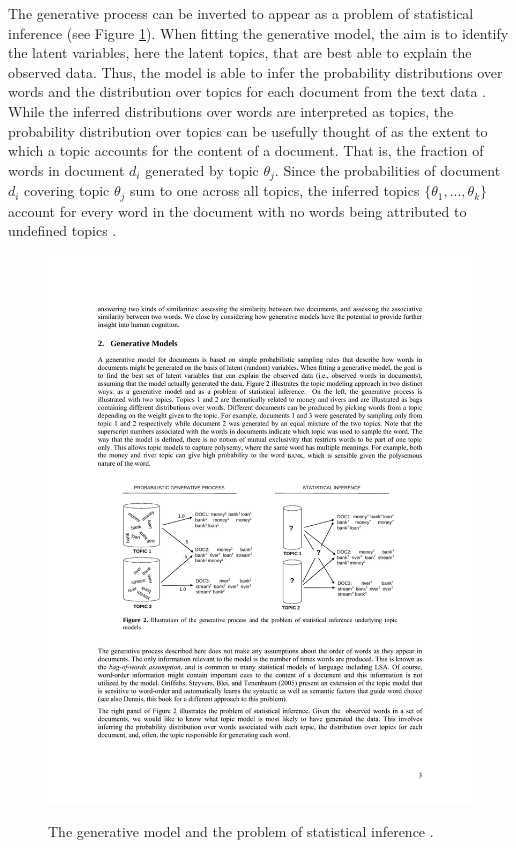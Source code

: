 \documentclass[11pt,a4paper,english,oneside]{book}
\numberwithin{equation}{chapter}
\begin{document}
The generative process can be inverted to appear as a problem of statistical inference (see Figure \ref{genproc}). When fitting the generative model, the aim is to identify the latent variables, here the latent topics, that are best able to explain the observed data. Thus, the model is able to infer the probability distributions over words and the distribution over topics for each document from the text data \cite[~p. 3]{Steyvers(2007)}. While the inferred distributions over words are interpreted as topics, the probability distribution over topics can be usefully thought of as the extent to which a topic accounts for the content of a document. That is, the fraction of words in document $d_i$ generated by topic $\theta_j$. 
Since the probabilities of document $d_i$ covering topic $\theta_{j}$ sum to one across all topics, the inferred topics $\{\theta_1, ..., \theta_k\}$ account for every word in the document with no words being attributed to undefined topics \cite[p.~338]{Zhai.2016}.

\begin{figure}
	\caption{The generative model and the problem of statistical inference \cite[p. 3]{Steyvers(2007)}.}
	\centering
	\includegraphics[scale=1]{Images/genproc.pdf}
	\label{genproc}
\end{figure}
\end{document}
